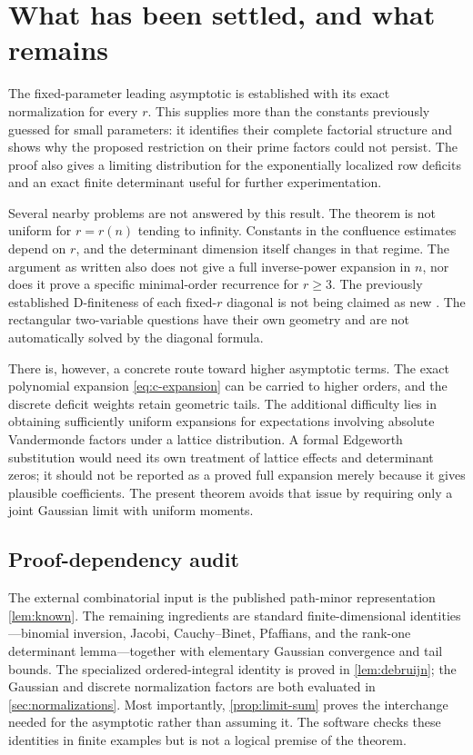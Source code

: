 \documentclass[11pt]{article}
\numberwithin{equation}{section}
\theoremstyle{definition}
\begin{document}
\section{What has been settled, and what remains}\label{sec:scope}

The fixed-parameter leading asymptotic is established with its exact normalization for every $r$. This supplies more than the constants previously guessed for small parameters: it identifies their complete factorial structure and shows why the proposed restriction on their prime factors could not persist. The proof also gives a limiting distribution for the exponentially localized row deficits and an exact finite determinant useful for further experimentation.

Several nearby problems are not answered by this result. The theorem is not uniform for $r=r(n)$ tending to infinity. Constants in the confluence estimates depend on $r$, and the determinant dimension itself changes in that regime. The argument as written also does not give a full inverse-power expansion in $n$, nor does it prove a specific minimal-order recurrence for $r\geq3$. The previously established D-finiteness of each fixed-$r$ diagonal is not being claimed as new \cite{DK}. The rectangular two-variable questions have their own geometry and are not automatically solved by the diagonal formula.

There is, however, a concrete route toward higher asymptotic terms. The exact polynomial expansion \eqref{eq:c-expansion} can be carried to higher orders, and the discrete deficit weights retain geometric tails. The additional difficulty lies in obtaining sufficiently uniform expansions for expectations involving absolute Vandermonde factors under a lattice distribution. A formal Edgeworth substitution would need its own treatment of lattice effects and determinant zeros; it should not be reported as a proved full expansion merely because it gives plausible coefficients. The present theorem avoids that issue by requiring only a joint Gaussian limit with uniform moments.

\subsection*{Proof-dependency audit}
The external combinatorial input is the published path-minor representation \cref{lem:known}. The remaining ingredients are standard finite-dimensional identities---binomial inversion, Jacobi, Cauchy--Binet, Pfaffians, and the rank-one determinant lemma---together with elementary Gaussian convergence and tail bounds. The specialized ordered-integral identity is proved in \cref{lem:debruijn}; the Gaussian and discrete normalization factors are both evaluated in \cref{sec:normalizations}. Most importantly, \cref{prop:limit-sum} proves the interchange needed for the asymptotic rather than assuming it. The software checks these identities in finite examples but is not a logical premise of the theorem.
\end{document}
